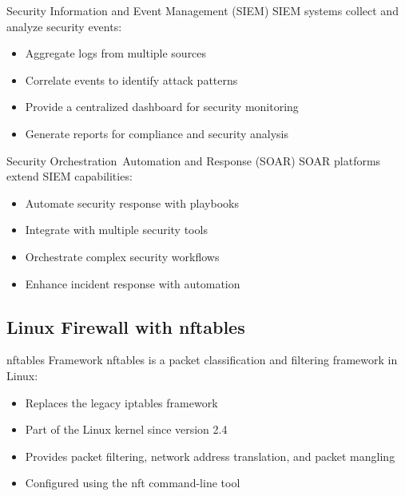 \begin{concept}{Security Information and Event Management (SIEM)}
SIEM systems collect and analyze security events:
\begin{itemize}
    \item Aggregate logs from multiple sources
    \item Correlate events to identify attack patterns
    \item Provide a centralized dashboard for security monitoring
    \item Generate reports for compliance and security analysis
\end{itemize}
\end{concept}

\begin{concept}{Security Orchestration\, Automation and Response (SOAR)}
SOAR platforms extend SIEM capabilities:
\begin{itemize}
    \item Automate security response with playbooks
    \item Integrate with multiple security tools
    \item Orchestrate complex security workflows
    \item Enhance incident response with automation
\end{itemize}
\end{concept}

\subsection{Linux Firewall with nftables}

\begin{definition}{nftables Framework}
nftables is a packet classification and filtering framework in Linux:
\begin{itemize}
    \item Replaces the legacy iptables framework
    \item Part of the Linux kernel since version 2.4
    \item Provides packet filtering, network address translation, and packet mangling
    \item Configured using the nft command-line tool
\end{itemize}
\end{definition}

